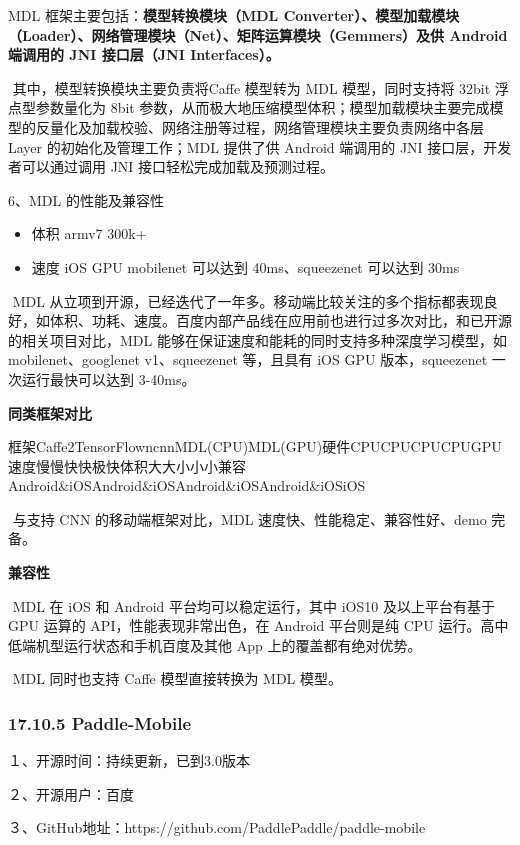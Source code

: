 MDL 框架主要包括：\textbf{模型转换模块（MDL
Converter）、模型加载模块（Loader）、网络管理模块（Net）、矩阵运算模块（Gemmers）及供
Android 端调用的 JNI 接口层（JNI Interfaces）。}

​ 其中，模型转换模块主要负责将Caffe 模型转为 MDL 模型，同时支持将 32bit
浮点型参数量化为 8bit
参数，从而极大地压缩模型体积；模型加载模块主要完成模型的反量化及加载校验、网络注册等过程，网络管理模块主要负责网络中各层
Layer 的初始化及管理工作；MDL 提供了供 Android 端调用的 JNI
接口层，开发者可以通过调用 JNI 接口轻松完成加载及预测过程。

6、MDL 的性能及兼容性

\begin{itemize}
\item
  体积 armv7 300k+
\item
  速度 iOS GPU mobilenet 可以达到 40ms、squeezenet 可以达到 30ms
\end{itemize}

​ MDL
从立项到开源，已经迭代了一年多。移动端比较关注的多个指标都表现良好，如体积、功耗、速度。百度内部产品线在应用前也进行过多次对比，和已开源的相关项目对比，MDL
能够在保证速度和能耗的同时支持多种深度学习模型，如 mobilenet、googlenet
v1、squeezenet 等，且具有 iOS GPU 版本，squeezenet 一次运行最快可以达到
3-40ms。

\textbf{同类框架对比}

​
框架Caffe2TensorFlowncnnMDL(CPU)MDL(GPU)硬件CPUCPUCPUCPUGPU速度慢慢快快极快体积大大小小小兼容Android\&iOSAndroid\&iOSAndroid\&iOSAndroid\&iOSiOS

​ 与支持 CNN 的移动端框架对比，MDL 速度快、性能稳定、兼容性好、demo
完备。

\textbf{兼容性}

​ MDL 在 iOS 和 Android 平台均可以稳定运行，其中 iOS10 及以上平台有基于
GPU 运算的 API，性能表现非常出色，在 Android 平台则是纯 CPU
运行。高中低端机型运行状态和手机百度及其他 App 上的覆盖都有绝对优势。

​ MDL 同时也支持 Caffe 模型直接转换为 MDL 模型。

\subsubsection{17.10.5 Paddle-Mobile}\label{paddle-mobile}

１、开源时间：持续更新，已到3.0版本　　　

２、开源用户：百度　　　　

３、GitHub地址：https://github.com/PaddlePaddle/paddle-mobile　

